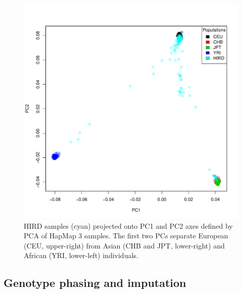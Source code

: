 \begin{figure}
    \includegraphics[width=1.0\textwidth]{mainmatter/figures/chapter_02/coreex_eQTLflu_20171204.gencall.smajor.impute_sex.qc3.pruned.hapmap_merged.flipped.pca.evec.pdf}
    \caption{\gls{HIRD} samples (cyan) projected onto \gls{PC}1 and \gls{PC}2 axes defined by \gls{PCA} of HapMap 3 samples. The first two \glspl{PC} separate European (CEU, upper-right) from Asian (CHB and JPT, lower-right) and African (YRI, lower-left) individuals.}
    \label{fig:hird_genotype_pca_withHapmap}
\end{figure}

\subsection{Genotype phasing and imputation}

